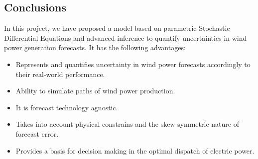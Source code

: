 \documentclass[ima, 25pt, portrait, plainboxedsections]{sciposter}
\begin{document}
\begin{multicols}{3}
\section*{Conclusions}
In this project, we have proposed a model based on parametric Stochastic Differential Equations and advanced inference to quantify uncertainties in wind power generation forecasts. It has the following advantages:
\begin{itemize}
\item  Represents and quantifies uncertainty in wind power forecasts accordingly to their real-world performance.
\item Ability to simulate paths of wind power production.
\item It is forecast technology agnostic.
\item  Takes into account physical constrains and the skew-symmetric nature of forecast error.
\item Provides a basis for decision making in the optimal dispatch of electric power.
\end{itemize}



\end{multicols}
\end{document}
